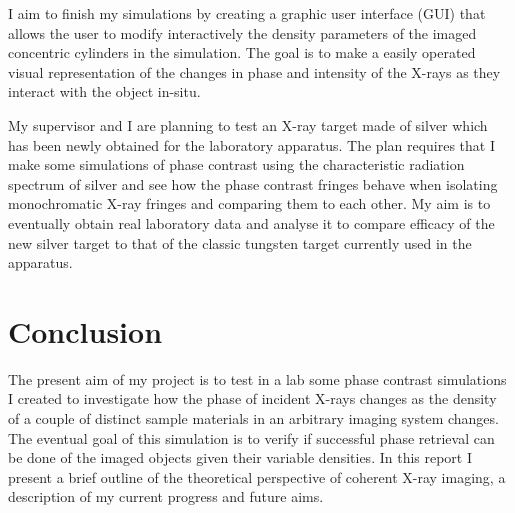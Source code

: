 \documentclass[9pt, a4paper]{article}
\begin{document}
I aim to finish my simulations by creating a graphic user interface (GUI) that allows the user to modify interactively the density parameters of the imaged concentric cylinders in the simulation. The goal is to make a easily operated visual representation of the changes in phase and intensity of the X-rays as they interact with the object in-situ.

My supervisor and I are planning to test an X-ray target made of silver which has been newly obtained for the laboratory apparatus. The plan requires that I make some simulations of phase contrast using the characteristic radiation spectrum of silver and see how the phase contrast fringes behave when isolating monochromatic X-ray fringes and comparing them to each other. My aim is to eventually obtain real laboratory data and analyse it to compare efficacy of the new silver target to that of the classic tungsten target currently used in the apparatus.


\section{Conclusion}
The present aim of my project is to test in a lab some phase contrast simulations I created to investigate how the phase of incident X-rays changes as the density of a couple of distinct sample materials in an arbitrary imaging system changes. The eventual goal of this simulation is to verify if successful phase retrieval can be done of the imaged objects given their variable densities. In this report I present a brief outline of the theoretical perspective of coherent X-ray imaging, a description of my current progress and future aims.



\end{document}
